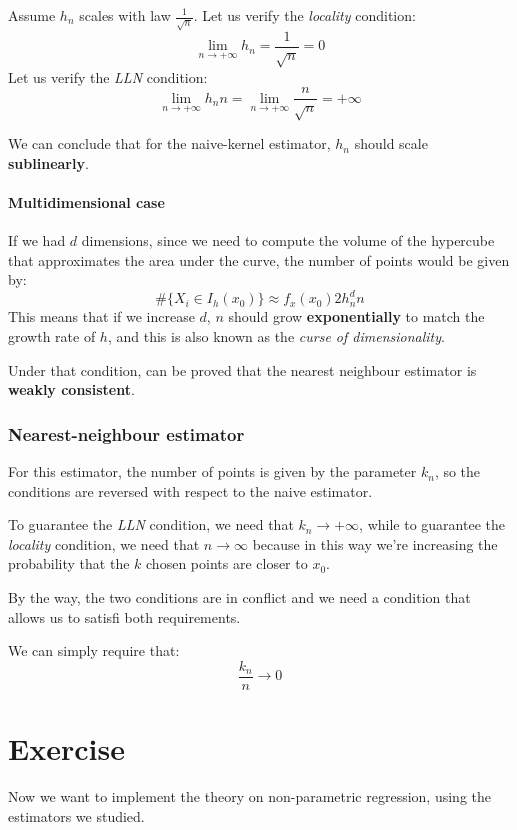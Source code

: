 \begin{exercise}
    Assume $h_n$ scales with law $\frac{1}{\sqrt{n}}$. Let us verify the \textit{locality} condition:
    \[
        \lim_{n \to +\infty} h_n = \frac{1}{\sqrt{n}} = 0
    \]
    Let us verify the \textit{LLN} condition:
    \[
        \lim_{n \to +\infty} h_n n = \lim_{n \to +\infty} \frac{n}{\sqrt{n}} = +\infty
    \]
\end{exercise}

We can conclude that for the naive-kernel estimator, $h_n$ should scale \textbf{sublinearly}.

\paragraph*{Multidimensional case}
If we had $d$ dimensions, since we need to compute the volume of the hypercube that approximates the area under the curve, the number of points would be given by:
\[
    \#\{X_i \in I_h(x_0)\} \approx f_x(x_0) 2 h^d_n n
\]
This means that if we increase $d$, $n$ should grow \textbf{exponentially} to match the growth rate of $h$, and this is also known as the \textit{curse of dimensionality}.

Under that condition, can be proved that the nearest neighbour estimator is \textbf{weakly consistent}.
\subsubsection{Nearest-neighbour estimator}
For this estimator, the number of points is given by the parameter $k_n$, so the conditions are reversed with respect to the naive estimator.

To guarantee the \textit{LLN} condition, we need that $k_n \to +\infty$, while to guarantee the \textit{locality} condition, we need that $n \to \infty$ because in this way we're increasing the probability that the $k$ chosen points are closer to $x_0$.

By the way, the two conditions are in conflict and we need a condition that allows us to satisfi both requirements. 

We can simply require that:
\[
    \frac{k_n}{n} \to 0
\]

\section{Exercise}
Now we want to implement the theory on non-parametric regression, using the estimators we studied.

